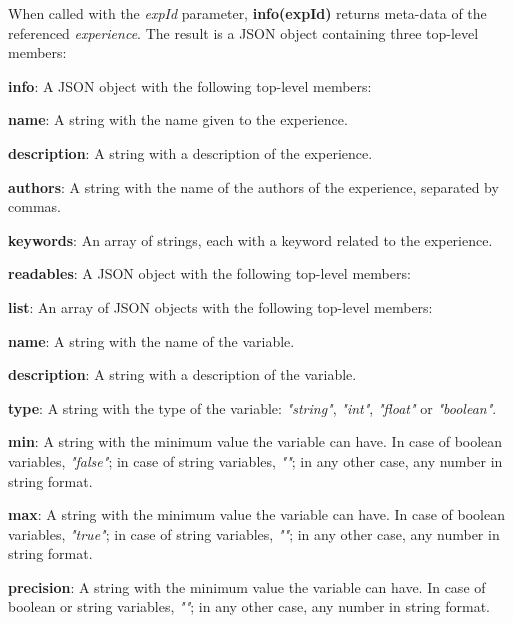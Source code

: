 When called with the \textit{expId} parameter, \textbf{info(expId)} returns meta-data of the referenced \textit{experience}. The result is a JSON object containing three top-level members:

\begin{myEnumerate}
    \item \textbf{info}: A JSON object with the following top-level members:
    \begin{myEnumerate}
        \item \textbf{name}: A string with the name given to the experience.
        \item \textbf{description}: A string with a description of the experience.
        \item \textbf{authors}: A string with the name of the authors of the experience, separated by commas.
        \item \textbf{keywords}: An array of strings, each with a keyword related to the experience.
    \end{myEnumerate}
    \item \textbf{readables}: A JSON object with the following top-level members:
    \begin{myEnumerate}
        \item \textbf{list}: An array of JSON objects with the following top-level members:
        \begin{myEnumerate}
            \item \textbf{name}: A string with the name of the variable.
            \item \textbf{description}: A string with a description of the variable.
            \item \textbf{type}: A string with the type of the variable: \textit{"string"}, \textit{"int"}, \textit{"float"} or \textit{"boolean"}.
            \item \textbf{min}: A string with the minimum value the variable can have. In case of boolean variables, \textit{"false"}; in case of string variables, \textit{""}; in any other case, any number in string format.
            \item \textbf{max}: A string with the minimum value the variable can have. In case of boolean variables, \textit{"true"}; in case of string variables, \textit{""}; in any other case, any number in string format.
            \item \textbf{precision}: A string with the minimum value the variable can have. In case of boolean or string variables, \textit{""}; in any other case, any number in string format.

\end{myEnumerate}
\end{myEnumerate}
\end{myEnumerate}
